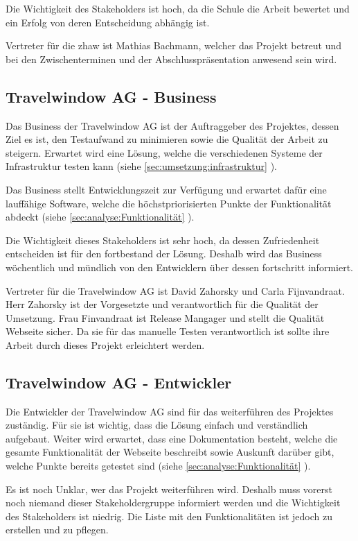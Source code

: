 Die Wichtigkeit des Stakeholders ist hoch, da die Schule die Arbeit bewertet und ein Erfolg von deren Entscheidung abhängig ist.

Vertreter für die \gls{zhaw} ist Mathias Bachmann, welcher das Projekt betreut und bei den Zwischenterminen und der Abschlusspräsentation anwesend sein wird.

\subsection{Travelwindow AG - Business}
Das Business der Travelwindow AG ist der Auftraggeber des Projektes, dessen Ziel es ist, den Testaufwand zu minimieren sowie die Qualität der Arbeit zu steigern. Erwartet wird eine Lösung, welche die verschiedenen Systeme der Infrastruktur testen kann (siehe \cref{sec:umsetzung:infrastruktur} ).

Das Business stellt Entwicklungszeit zur Verfügung und erwartet dafür eine lauffähige Software, welche die höchstpriorisierten Punkte der Funktionalität abdeckt (siehe \cref{sec:analyse:Funktionalität} ).

Die Wichtigkeit dieses Stakeholders ist sehr hoch, da dessen Zufriedenheit entscheiden ist für den fortbestand der Lösung. Deshalb wird das Business wöchentlich und mündlich von den Entwicklern über dessen fortschritt informiert.

Vertreter für die Travelwindow AG ist David Zahorsky und Carla Fijnvandraat. Herr Zahorsky ist der Vorgesetzte und verantwortlich für die Qualität der Umsetzung. Frau Finvandraat ist Release Mangager und stellt die Qualität Webseite sicher. Da sie für das manuelle Testen verantwortlich ist sollte ihre Arbeit durch dieses Projekt erleichtert werden.

\subsection{Travelwindow AG - Entwickler}
Die Entwickler der Travelwindow AG sind für das weiterführen des Projektes zuständig. Für sie ist wichtig, dass die Lösung einfach und verständlich aufgebaut. Weiter wird erwartet, dass eine Dokumentation besteht, welche die gesamte Funktionalität der Webseite beschreibt sowie Auskunft darüber gibt, welche Punkte bereits getestet sind (siehe \cref{sec:analyse:Funktionalität} ).

Es ist noch Unklar, wer das Projekt weiterführen wird. Deshalb muss vorerst noch niemand dieser Stakeholdergruppe informiert werden und die Wichtigkeit des Stakeholders ist niedrig. Die Liste mit den Funktionalitäten ist jedoch zu erstellen und zu pflegen.

